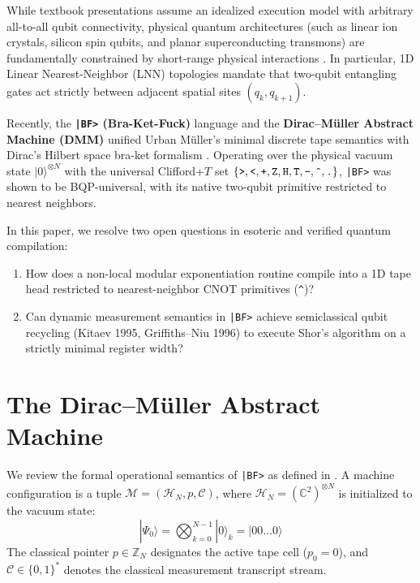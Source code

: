\documentclass[11pt,a4paper,twocolumn]{article}
\newcommand{\ket}[1]{| #1 \rangle}
\begin{document}
While textbook presentations assume an idealized execution model with arbitrary all-to-all qubit connectivity, physical quantum architectures (such as linear ion crystals, silicon spin qubits, and planar superconducting transmons) are fundamentally constrained by short-range physical interactions \cite{fowler2004lnn,saeedi2011lnn}. In particular, 1D Linear Nearest-Neighbor (LNN) topologies mandate that two-qubit entangling gates act strictly between adjacent spatial sites $(q_k, q_{k+1})$.

Recently, the \textbf{\texttt{|BF>} (Bra-Ket-Fuck)} language and the \textbf{Dirac--M\"uller Abstract Machine (DMM)} \cite{matocl2026bf} unified Urban M\"uller's minimal discrete tape semantics \cite{muller1993brainfuck} with Dirac's Hilbert space bra-ket formalism \cite{dirac1939notation,nielsen2010quantum}. Operating over the physical vacuum state $\ket{0}^{\otimes N}$ with the universal Clifford+$T$ set $\{\texttt{>}, \texttt{<}, \texttt{+}, \texttt{Z}, \texttt{H}, \texttt{T}, \texttt{-}, \texttt{\^{}}, \texttt{.}\}$, \texttt{|BF>} was shown to be BQP-universal, with its native two-qubit primitive restricted to nearest neighbors.

In this paper, we resolve two open questions in esoteric and verified quantum compilation:
\begin{enumerate}
    \item How does a non-local modular exponentiation routine compile into a 1D tape head restricted to nearest-neighbor CNOT primitives (\texttt{\^{}})?
    \item Can dynamic measurement semantics in \texttt{|BF>} achieve semiclassical qubit recycling (Kitaev 1995, Griffiths--Niu 1996) \cite{kitaev1995quantum,griffiths1996semiclassical} to execute Shor's algorithm on a strictly minimal register width?
\end{enumerate}

\section{The Dirac--M\"uller Abstract Machine}

We review the formal operational semantics of \texttt{|BF>} as defined in \cite{matocl2026bf}. A machine configuration is a tuple $\mathcal{M} = (\mathcal{H}_N, p, \mathcal{C})$, where $\mathcal{H}_N = (\mathbb{C}^2)^{\otimes N}$ is initialized to the vacuum state:
\begin{equation}
    \ket{\Psi_0} = \bigotimes_{k=0}^{N-1} \ket{0}_k = \ket{00\dots 0}
\end{equation}
The classical pointer $p \in \mathbb{Z}_N$ designates the active tape cell ($p_0 = 0$), and $\mathcal{C} \in \{0,1\}^*$ denotes the classical measurement transcript stream.
\end{document}
